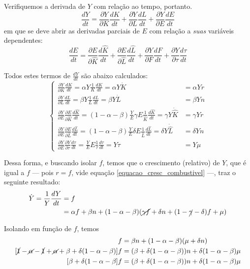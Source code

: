 Verifiquemos a derivada de $Y$ com relação ao tempo, portanto.
$$
\frac{dY}{dt} = \frac{ \partial Y }{ \partial K } \frac{dK}{dt} + \frac{ \partial Y }{ \partial L } \frac{dL}{dt} + \frac{ \partial Y }{ \partial E } \frac{dE}{dt} 
$$
em que se deve abrir as derivadas parciais de $E$ com relação a \textit{suas} variáveis dependentes:
$$
\frac{dE}{dt} = \frac{ \partial E }{ \partial \hat{K} } \frac{d \hat{K}}{dt} + \frac{ \partial E }{ \partial \hat{L} } \frac{d\hat{L}}{dt} + \frac{ \partial Y }{ \partial F } \frac{dF}{dt} + \frac{ \partial Y }{ \partial \tau } \frac{d\tau}{dt}
$$

Todos estes termos de $\frac{dY}{dt}$ são abaixo calculados:
$$
\begin{cases}
\frac{ \partial Y }{ \partial K } \frac{dK}{dt} = \alpha Y \frac{1}{K} \frac{dK}{dt} = \alpha Y \dot{K} &= \alpha Yr\\
\frac{ \partial Y }{ \partial L } \frac{dL}{dt} = \beta Y \frac{1}{L} \frac{dL}{dt} = \beta Y \dot{L} &= \beta Y n\\
 \frac{ \partial Y }{ \partial E }\frac{ \partial E }{ \partial \hat{K} } \frac{d \hat{K}}{dt} = (1-\alpha-\beta) \frac{Y}{E} \gamma E \frac{1}{\hat{K}} \frac{d\hat{K}}{dt} = \gamma Y\dot{\hat{K}} &= \gamma Y r \\
  \frac{ \partial Y }{ \partial E }\frac{ \partial E }{ \partial \hat{L} } \frac{d \hat{L}}{dt} = (1-\alpha-\beta) \frac{Y}{E} \delta E \frac{1}{\hat{L}} \frac{d\hat{L}}{dt} = \delta Y \dot{\hat{L}} &= \delta Yn \\
  \frac{ \partial Y }{ \partial E }\frac{ \partial Y }{ \partial \tau } \frac{d\tau}{dt} = \frac{Y}{E} E \frac{1}{\tau} \frac{d\tau}{dt} = Y \dot{\tau} &= Y \mu
\end{cases}
$$

Dessa forma, e buscando isolar $f$, temos que o crescimento (relativo) de $Y$, que é igual a $f$ --- pois $r=f$, vide equação \ref{equacao_cresc_combustivel} ---, traz o seguinte resultado:
\begin{align*}
\dot{Y} = \frac{1}{Y} \frac{dY}{dt} &= f\\
&= \alpha f + \beta n + (1-\alpha-\beta) (\cancel{ \gamma f } + \delta n + (1-\cancel{ \gamma }-\delta) f + \mu)
\end{align*}

Isolando em função de $f$, temos
\begin{align*}
[1 - \alpha - (1-\alpha-\beta)(1-\delta) ] f &= \beta n + (1-\alpha-\beta) (\mu + \delta n) \\
[\cancel{ 1 }-\cancel{ \alpha } - \cancel{ 1 }+\cancel{ \alpha }+\beta + \delta(1-\alpha-\beta)] f &= (\beta + \delta(1-\alpha-\beta)) n + \delta(1-\alpha-\beta) \mu \\
[\beta+\delta(1-\alpha-\beta] f &= (\beta + \delta(1-\alpha-\beta)) n + \delta(1-\alpha-\beta) \mu
\end{align*}

